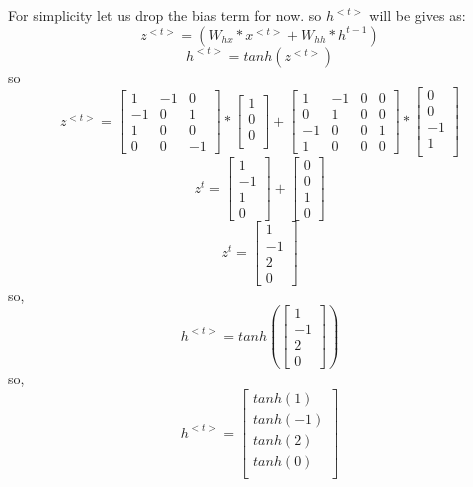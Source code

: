 \documentclass[12pt,letterpaper]{article}
\begin{document}
For simplicity let us drop the bias term for now.
so $h^{<t>}$ will be gives as:
\[
z^{<t>} = (W_{hx}*x^{<t>}+W_{hh}*h^{t-1})
\]
\[
h^{<t>} = tanh(z^{<t>})
\]
so 
\[
z^{<t>} = \begin{bmatrix}
1 &-1& 0\\
-1& 0& 1\\
1 &0 &0\\
0 &0& -1
\end{bmatrix}*\begin{bmatrix}
1\\
0\\
0\\
\end{bmatrix} + 
\begin{bmatrix}
1 &-1&0&0\\
0&1&0&0\\
-1&0&0&1\\
1&0&0&0
\end{bmatrix}*\begin{bmatrix}
0\\
0\\
-1\\
1\\
\end{bmatrix}
\]
\[
z^{t} = \begin{bmatrix}
1\\
-1\\
1\\
0
\end{bmatrix}+\begin{bmatrix}
0\\0\\1\\0
\end{bmatrix}
\]
\[
z^{t} = \begin{bmatrix}
1\\
-1\\
2\\
0
\end{bmatrix}
\]
so,
\[
h^{<t>} = tanh(\begin{bmatrix}
1\\
-1\\
2\\
0
\end{bmatrix})
\]
so,
\[
h^{<t>} = \begin{bmatrix}
tanh(1)\\
tanh(-1)\\
tanh(2)\\
tanh(0)\\
\end{bmatrix}
\]
\end{document}

